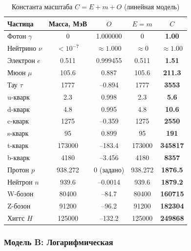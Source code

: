 \documentclass[12pt,a4paper]{article}
\begin{document}
\begin{table}[h]
    \centering
    \caption{Константа масштаба $C = E + m + O$ (линейная модель)}
    \begin{tabular}{lcccc}
        \toprule
        Частица & Масса, МэВ & $O$ & $E=m$ & $C$ \\
        \midrule
        Фотон $\gamma$ & 0 & 1.000000 & 0 & \textbf{1.00} \\
        Нейтрино $\nu$ & $<10^{-7}$ & $\approx 1.000$ & $\approx 0$ & $\approx 1.00$ \\
        Электрон $e$ & 0.511 & 0.999455 & 0.511 & \textbf{1.51} \\
        Мюон $\mu$ & 105.6 & 0.887 & 105.6 & \textbf{211.3} \\
        Тау $\tau$ & 1777 & --0.894 & 1777 & \textbf{3553} \\
        u-кварк & 2.3 & 0.998 & 2.3 & \textbf{5.6} \\
        d-кварк & 4.8 & 0.995 & 4.8 & \textbf{10.6} \\
        c-кварк & 1275 & --0.359 & 1275 & \textbf{2550} \\
        s-кварк & 95 & 0.899 & 95 & \textbf{191} \\
        t-кварк & 173000 & --183.4 & 173000 & \textbf{345817} \\
        b-кварк & 4180 & --3.456 & 4180 & \textbf{8357} \\
        Протон $p$ & 938.272 & 0 (задано) & 938.272 & \textbf{1876.5} \\
        Нейтрон $n$ & 939.6 & --0.0014 & 939.6 & \textbf{1879.2} \\
        W-бозон & 80400 & --84.7 & 80400 & \textbf{160715} \\
        Z-бозон & 91200 & --96.2 & 91200 & \textbf{182304} \\
        Хиггс $H$ & 125000 & --132.2 & 125000 & \textbf{249868} \\
        \bottomrule
    \end{tabular}
    \label{tab:modelA}
\end{table}

\subsubsection{Модель B: Логарифмическая}
\end{document}
